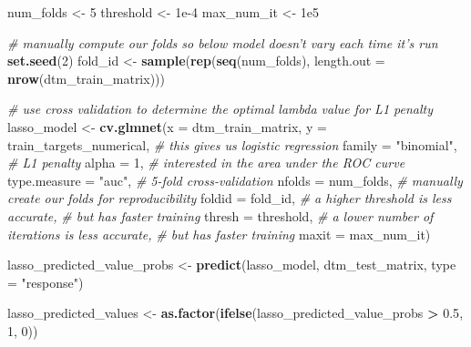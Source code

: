 \documentclass[12pt]{article}
\newenvironment{Shaded}{\begin{snugshade}}{\end{snugshade}}
\newcommand{\CommentTok}[1]{\textcolor[rgb]{0.56,0.35,0.01}{\textit{#1}}}
\newcommand{\DataTypeTok}[1]{\textcolor[rgb]{0.13,0.29,0.53}{#1}}
\newcommand{\DecValTok}[1]{\textcolor[rgb]{0.00,0.00,0.81}{#1}}
\newcommand{\FloatTok}[1]{\textcolor[rgb]{0.00,0.00,0.81}{#1}}
\newcommand{\KeywordTok}[1]{\textcolor[rgb]{0.13,0.29,0.53}{\textbf{#1}}}
\newcommand{\NormalTok}[1]{#1}
\newcommand{\OperatorTok}[1]{\textcolor[rgb]{0.81,0.36,0.00}{\textbf{#1}}}
\newcommand{\StringTok}[1]{\textcolor[rgb]{0.31,0.60,0.02}{#1}}
\begin{document}
\begin{Shaded}
\begin{Highlighting}[]
\NormalTok{num_folds <-}\StringTok{ }\DecValTok{5}
\NormalTok{threshold <-}\StringTok{ }\FloatTok{1e-4}
\NormalTok{max_num_it <-}\StringTok{ }\FloatTok{1e5}

\CommentTok{# manually compute our folds so below model doesn't vary each time it's run}
\KeywordTok{set.seed}\NormalTok{(}\DecValTok{2}\NormalTok{)}
\NormalTok{fold_id <-}\StringTok{ }\KeywordTok{sample}\NormalTok{(}\KeywordTok{rep}\NormalTok{(}\KeywordTok{seq}\NormalTok{(num_folds), }\DataTypeTok{length.out =} \KeywordTok{nrow}\NormalTok{(dtm_train_matrix)))}

\CommentTok{# use cross validation to determine the optimal lambda value for L1 penalty}
\NormalTok{lasso_model <-}\StringTok{ }\KeywordTok{cv.glmnet}\NormalTok{(}\DataTypeTok{x =}\NormalTok{ dtm_train_matrix, }\DataTypeTok{y =}\NormalTok{ train_targets_numerical, }
                              \CommentTok{# this gives us logistic regression}
                              \DataTypeTok{family =} \StringTok{"binomial"}\NormalTok{, }
                              \CommentTok{# L1 penalty}
                              \DataTypeTok{alpha =} \DecValTok{1}\NormalTok{,}
                              \CommentTok{# interested in the area under the ROC curve}
                              \DataTypeTok{type.measure =} \StringTok{"auc"}\NormalTok{,}
                              \CommentTok{# 5-fold cross-validation}
                              \DataTypeTok{nfolds =}\NormalTok{ num_folds,}
                              \CommentTok{# manually create our folds for reproducibility}
                              \DataTypeTok{foldid =}\NormalTok{ fold_id,}
                              \CommentTok{# a higher threshold is less accurate, }
                              \CommentTok{# but has faster training}
                              \DataTypeTok{thresh =}\NormalTok{ threshold,}
                              \CommentTok{# a lower number of iterations is less accurate,}
                              \CommentTok{# but has faster training}
                              \DataTypeTok{maxit =}\NormalTok{ max_num_it) }

\NormalTok{lasso_predicted_value_probs <-}\StringTok{ }\KeywordTok{predict}\NormalTok{(lasso_model, dtm_test_matrix, }
                                       \DataTypeTok{type =} \StringTok{"response"}\NormalTok{)}

\NormalTok{lasso_predicted_values <-}\StringTok{ }\KeywordTok{as.factor}\NormalTok{(}\KeywordTok{ifelse}\NormalTok{(lasso_predicted_value_probs }\OperatorTok{>}\StringTok{ }\FloatTok{0.5}\NormalTok{, }\DecValTok{1}\NormalTok{, }\DecValTok{0}\NormalTok{))}


\end{Highlighting}
\end{Shaded}
\end{document}

